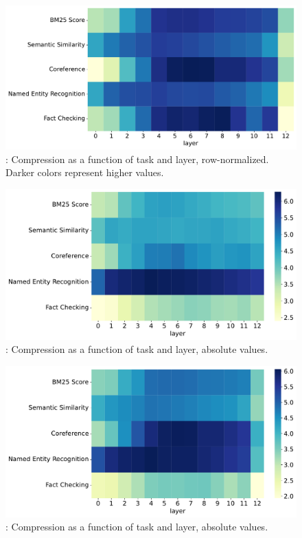 \begin{figure}
    \includegraphics[width=\textwidth]{gfx/probing/heatmap_compression_passage}
    \caption{: Compression as a function of task and layer, row-normalized. Darker colors represent higher values.}
    \label{fig:heatmap_comp_passage}
\end{figure}


\begin{figure}
    \centering
    \includegraphics[width=\textwidth]{gfx/probing/abs_heatmap_compression_base}
    \caption{: Compression as a function of task and layer, absolute values.}
    \label{fig:abs_heatmap_comp_base}
\end{figure}

\begin{figure}
    \centering
    \includegraphics[width=\textwidth]{gfx/probing/abs_heatmap_compression_passage}
    \caption{: Compression as a function of task and layer, absolute values.}
    \label{fig:abs_heatmap_comp_passage}
\end{figure}




